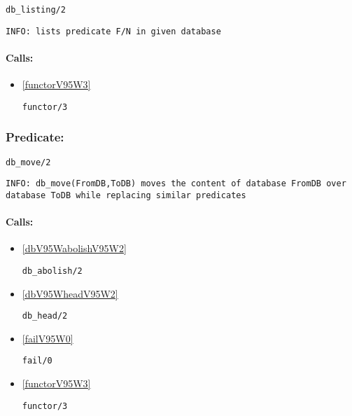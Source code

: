 \begin{verbatim}
db_listing/2
\end{verbatim}

{\small \begin{verbatim}
INFO: lists predicate F/N in given database

\end{verbatim}}
\paragraph{Calls:} 
\begin{itemize}
\item \ref{functorV95W3} 
\begin{verbatim}
functor/3
\end{verbatim}

\end{itemize}

\subsubsection{Predicate:} \label{dbV95WmoveV95W2}

\begin{verbatim}
db_move/2
\end{verbatim}

{\small \begin{verbatim}
INFO: db_move(FromDB,ToDB) moves the content of database FromDB over database ToDB while replacing similar predicates

\end{verbatim}}
\paragraph{Calls:} 
\begin{itemize}
\item \ref{dbV95WabolishV95W2} 
\begin{verbatim}
db_abolish/2
\end{verbatim}

\item \ref{dbV95WheadV95W2} 
\begin{verbatim}
db_head/2
\end{verbatim}

\item \ref{failV95W0} 
\begin{verbatim}
fail/0
\end{verbatim}

\item \ref{functorV95W3} 
\begin{verbatim}
functor/3
\end{verbatim}

\end{itemize}

